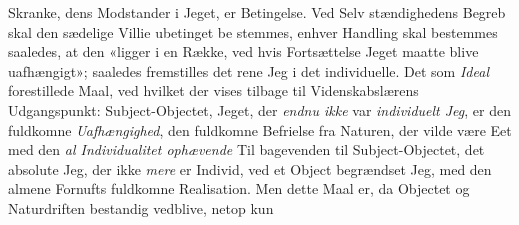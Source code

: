 \documentclass[12pt,a4paper]{book}
\begin{document}
Skranke, dens Modstander i Jeget, er Betingelse. Ved Selv\-%
stændighedens Begreb skal den sædelige Villie ubetinget be\-%
stemmes, enhver Handling skal bestemmes saaledes, at den
«ligger i en Række, ved hvis Fortsættelse Jeget maatte blive
uafhængigt»; saaledes fremstilles det rene Jeg i det individuelle.
Det som \emph{Ideal} forestillede Maal, ved hvilket der vises tilbage
til Videnskabslærens Udgangspunkt: Subject-Objectet, Jeget,
der \emph{endnu ikke} var \emph{individuelt Jeg}, er den fuldkomne
\emph{Uafhængighed}, den fuldkomne Befrielse fra Naturen, der vilde
være Eet med den \emph{al Individualitet ophævende} Til\-%
bagevenden til Subject-Objectet, det absolute Jeg, der ikke
\emph{mere} er Individ, ved et Object begrændset Jeg, med den
almene Fornufts fuldkomne Realisation. Men dette Maal er,
da Objectet og Naturdriften bestandig vedblive, netop kun
\end{document}
